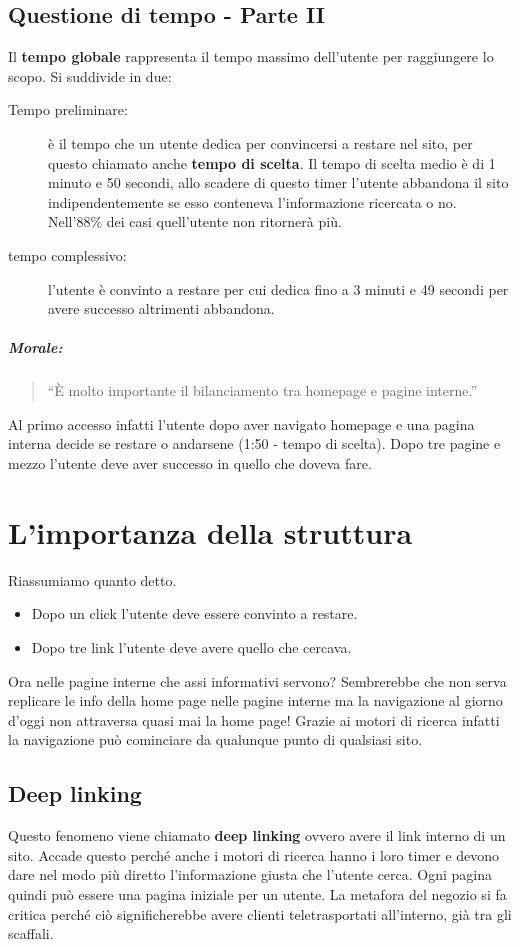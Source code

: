 		\subsection{Questione di tempo - Parte II}
			Il \textbf{tempo globale} rappresenta il tempo massimo dell'utente per raggiungere lo scopo. Si suddivide in due:
			\begin{description}
				\item[Tempo preliminare:] è il tempo che un utente dedica per convincersi a restare nel sito, per questo chiamato anche \textbf{tempo di scelta}. Il tempo di scelta medio è di 1 minuto e 50 secondi, allo scadere di questo timer l'utente abbandona il sito indipendentemente se esso conteneva l'informazione ricercata o no. Nell'88\% dei casi quell'utente non ritornerà più.
				\item[tempo complessivo:] l'utente è convinto a restare per cui dedica fino a 3 minuti e 49 secondi per avere successo altrimenti abbandona.
			\end{description}
			
			\subparagraph*{Morale:}
			\begin{quote}
				``È molto importante il bilanciamento tra homepage e pagine interne.''
			\end{quote}
			Al primo accesso infatti l'utente dopo aver navigato homepage e una pagina interna decide se restare o andarsene (1:50 - tempo di scelta). Dopo tre pagine e mezzo l'utente deve aver successo in quello che doveva fare.
	
	\section{L'importanza della struttura}
		Riassumiamo quanto detto.
		\begin{itemize}
			\item Dopo un click l'utente deve essere convinto a restare.
			\item Dopo tre link l'utente deve avere quello che cercava.
		\end{itemize}
		
		Ora nelle pagine interne che assi informativi servono? Sembrerebbe che non serva replicare le info della home page nelle pagine interne ma la navigazione al giorno d'oggi non attraversa quasi mai la home page!
		Grazie ai motori di ricerca infatti la navigazione può cominciare da qualunque punto di qualsiasi sito.
	
		\subsection{Deep linking}
			Questo fenomeno viene chiamato \textbf{deep linking} ovvero avere il link interno di un sito. Accade questo perché anche i motori di ricerca hanno i loro timer e devono dare nel modo più diretto l'informazione giusta che l'utente cerca.
		Ogni pagina quindi può essere una pagina iniziale per un utente. La metafora del negozio si fa critica perché ciò significherebbe avere clienti teletrasportati all'interno, già tra gli scaffali.
		
